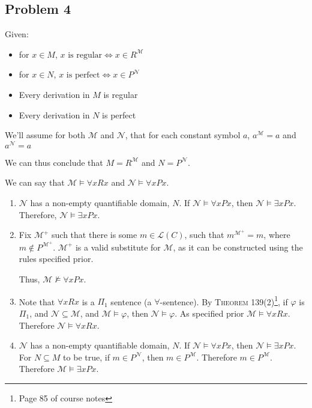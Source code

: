 \documentclass[a4paper]{article}
\newcommand{\MODEL}{\mathcal{M}}
\newcommand{\SUBMODEL}{\mathcal{N}}
\newcommand{\LANGUAGE}{\mathcal{L}}
\begin{document}
\subsection*{Problem 4}

Given:

\begin{itemize}
    \item for $x \in M$, $x \text{ is regular} \Leftrightarrow x \in R^{\mathcal{M}}$
    \item for $x \in N$, $x \text{ is perfect} \Leftrightarrow x \in P^{\mathcal{N}}$
    \item Every derivation in $M$ is regular
    \item Every derivation in $N$ is perfect
\end{itemize}

We'll assume for both $\mathcal{M}$ and $\mathcal{N}$, that for each constant symbol $a$, $a^{\mathcal{M}} = a$ and $a^{\mathcal{N}} = a$

We can thus conclude that $M = R^\mathcal{M}$ and $N = P^\mathcal{N}$.


We can say that $\mathcal{M} \models \forall x Rx$ and $\mathcal{N} \models \forall x Px$.

\begin{enumerate}

    \item $\mathcal{N}$ has a non-empty quantifiable domain, $N$. If $\mathcal{N} \models \forall x Px$, then $\mathcal{N} \models \exists x Px$. Therefore, $\mathcal{N} \models \exists x Px$.

    \item Fix $\mathcal{M^{+}}$ such that there is some $m \in $$\LANGUAGE(C)$, such that $m^\mathcal{M^{+}} = m$, where $m \not \in P^\mathcal{M^{+}}$. $\mathcal{M^{+}}$ is a valid substitute for $\MODEL$, as it can be constructed using the rules specified prior.

        Thus, $\MODEL \not \models \forall x P x$.

    \item Note that $\forall x Rx$ is a $\Pi_1$ sentence (a $\forall$-sentence). By \textsc{Theorem 139(2)}\footnote{Page 85 of course notes}, if $\varphi$ is $\Pi_1$, and $\SUBMODEL \subseteq \MODEL$, and $\mathcal{M} \models \varphi$, then $\mathcal{N} \models \varphi$. As specified prior $\mathcal{M} \models \forall x Rx$. Therefore $\mathcal{N} \models \forall x Rx$.

    \item $\mathcal{N}$ has a non-empty quantifiable domain, $N$. If $\SUBMODEL \models \forall x Px$, then $\mathcal{N} \models \exists x Px$. For $N \subseteq M$ to be true, if $m \in P^{\SUBMODEL}$, then $m \in P^{\MODEL}$. Therefore $m \in P^{\MODEL}$. Therefore $\MODEL \models \exists x Px$. 

\end{enumerate}
\end{document}
